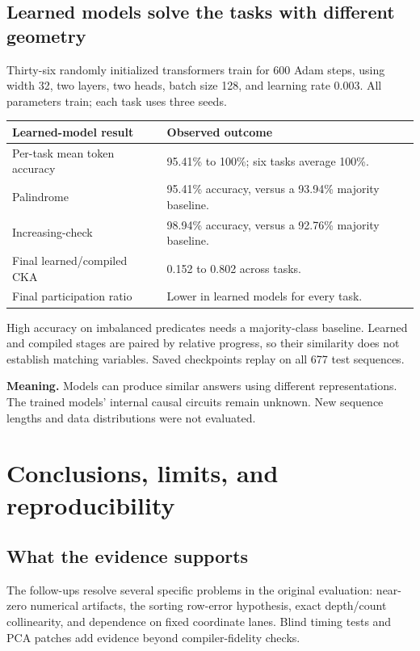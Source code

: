 \documentclass[11pt,a4paper]{article}
\newcommand{\newsection}[1]{\clearpage\section{#1}}
\begin{document}
\subsection*{Learned models solve the tasks with different geometry}
Thirty-six randomly initialized transformers train for 600 Adam steps, using width 32, two layers, two heads, batch size 128, and learning rate 0.003. All parameters train; each task uses three seeds.

\begin{center}\small
\begin{tabularx}{\linewidth}{@{}P{.33\linewidth}X@{}}
\toprule
\textbf{Learned-model result} & \textbf{Observed outcome}\\
\midrule
Per-task mean token accuracy & 95.41\% to 100\%; six tasks average 100\%.\\
Palindrome & 95.41\% accuracy, versus a 93.94\% majority baseline.\\
Increasing-check & 98.94\% accuracy, versus a 92.76\% majority baseline.\\
Final learned/compiled CKA & 0.152 to 0.802 across tasks.\\
Final participation ratio & Lower in learned models for every task.\\
\bottomrule
\end{tabularx}\end{center}

High accuracy on imbalanced predicates needs a majority-class baseline. Learned and compiled stages are paired by relative progress, so their similarity does not establish matching variables. Saved checkpoints replay on all 677 test sequences.

\textbf{Meaning.} Models can produce similar answers using different representations. The trained models' internal causal circuits remain unknown. New sequence lengths and data distributions were not evaluated.

\newsection{Conclusions, limits, and reproducibility}
\subsection*{What the evidence supports}
The follow-ups resolve several specific problems in the original evaluation: near-zero numerical artifacts, the sorting row-error hypothesis, exact depth/count collinearity, and dependence on fixed coordinate lanes. Blind timing tests and PCA patches add evidence beyond compiler-fidelity checks.
\end{document}
